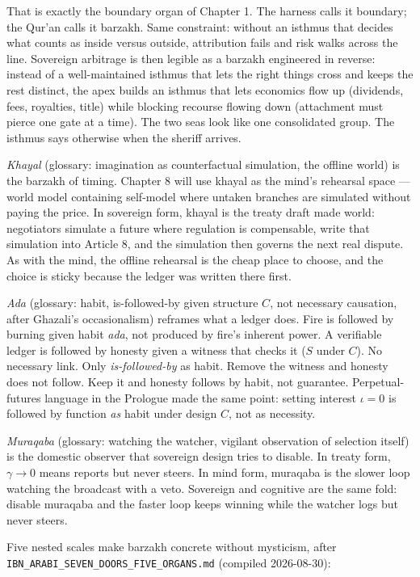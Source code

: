 That is exactly the boundary organ of Chapter 1. The harness calls it boundary; the Qur'an calls it barzakh. Same constraint: without an isthmus that decides what counts as inside versus outside, attribution fails and risk walks across the line. Sovereign arbitrage is then legible as a barzakh engineered in reverse: instead of a well-maintained isthmus that lets the right things cross and keeps the rest distinct, the apex builds an isthmus that lets economics flow up (dividends, fees, royalties, title) while blocking recourse flowing down (attachment must pierce one gate at a time). The two seas look like one consolidated group. The isthmus says otherwise when the sheriff arrives.

\textit{Khayal} (glossary: imagination as counterfactual simulation, the offline world) is the barzakh of timing. Chapter 8 will use khayal as the mind's rehearsal space --- world model containing self-model where untaken branches are simulated without paying the price. In sovereign form, khayal is the treaty draft made world: negotiators simulate a future where regulation is compensable, write that simulation into Article 8, and the simulation then governs the next real dispute. As with the mind, the offline rehearsal is the cheap place to choose, and the choice is sticky because the ledger was written there first.

\textit{Ada} (glossary: habit, is-followed-by given structure $C$, not necessary causation, after Ghazali's occasionalism) reframes what a ledger does. Fire is followed by burning given habit \textit{ada}, not produced by fire's inherent power. A verifiable ledger is followed by honesty given a witness that checks it ($S$ under $C$). No necessary link. Only \textit{is-followed-by} as habit. Remove the witness and honesty does not follow. Keep it and honesty follows by habit, not guarantee. Perpetual-futures language in the Prologue made the same point: setting interest $\iota=0$ is followed by function \textit{as} habit under design $C$, not as necessity.

\textit{Muraqaba} (glossary: watching the watcher, vigilant observation of selection itself) is the domestic observer that sovereign design tries to disable. In treaty form, $\gamma\to0$ means reports but never steers. In mind form, muraqaba is the slower loop watching the broadcast with a veto. Sovereign and cognitive are the same fold: disable muraqaba and the faster loop keeps winning while the watcher logs but never steers.

Five nested scales make barzakh concrete without mysticism, after \texttt{IBN\_ARABI\_SEVEN\_DOORS\_FIVE\_ORGANS.md} (compiled 2026-08-30):

